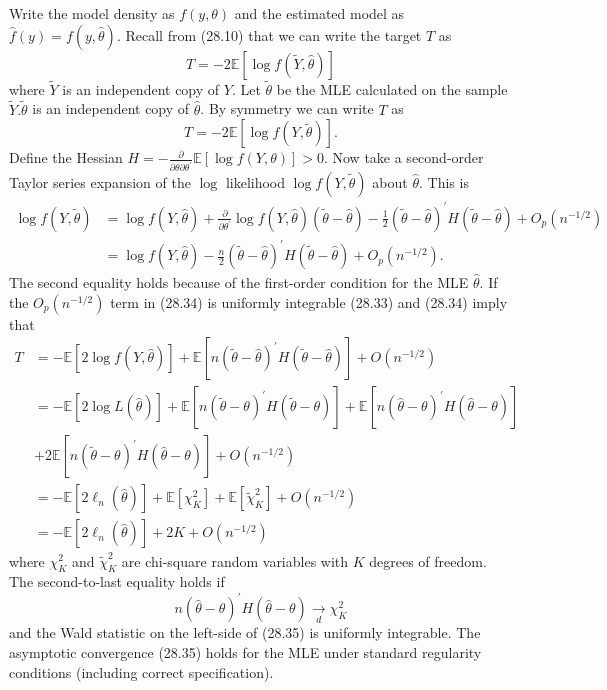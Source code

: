 \documentclass[10pt]{article}
\begin{document}
Write the model density as $f(y, \theta)$ and the estimated model as $\widehat{f}(y)=f(y, \widehat{\theta})$. Recall from (28.10) that we can write the target $T$ as
$$
T=-2 \mathbb{E}[\log f(\widetilde{Y}, \widehat{\theta})]
$$
where $\widetilde{Y}$ is an independent copy of $Y$. Let $\widetilde{\theta}$ be the MLE calculated on the sample $\widetilde{Y} . \widetilde{\theta}$ is an independent copy of $\widehat{\theta}$. By symmetry we can write $T$ as
$$
T=-2 \mathbb{E}[\log f(Y, \widetilde{\theta})] .
$$
Define the Hessian $H=-\frac{\partial}{\partial \theta \partial \theta^{\prime}} \mathbb{E}[\log f(Y, \theta)]>0$. Now take a second-order Taylor series expansion of the $\log$ likelihood $\log f(Y, \widetilde{\theta})$ about $\widehat{\theta}$. This is
$$
\begin{aligned}
\log f(Y, \widetilde{\theta}) &=\log f(Y, \widehat{\theta})+\frac{\partial}{\partial \theta^{\prime}} \log f(Y, \widehat{\theta})(\widetilde{\theta}-\widehat{\theta})-\frac{1}{2}(\widetilde{\theta}-\widehat{\theta})^{\prime} H(\widetilde{\theta}-\widehat{\theta})+O_{p}\left(n^{-1 / 2}\right) \\
&=\log f(Y, \widehat{\theta})-\frac{n}{2}(\widetilde{\theta}-\widehat{\theta})^{\prime} H(\widetilde{\theta}-\widehat{\theta})+O_{p}\left(n^{-1 / 2}\right) .
\end{aligned}
$$
The second equality holds because of the first-order condition for the MLE $\widehat{\theta}$. If the $O_{p}\left(n^{-1 / 2}\right)$ term in (28.34) is uniformly integrable (28.33) and (28.34) imply that
$$
\begin{aligned}
T &=-\mathbb{E}[2 \log f(Y, \widehat{\theta})]+\mathbb{E}\left[n(\widetilde{\theta}-\widehat{\theta})^{\prime} H(\widetilde{\theta}-\widehat{\theta})\right]+O\left(n^{-1 / 2}\right) \\
&=-\mathbb{E}[2 \log L(\widehat{\theta})]+\mathbb{E}\left[n(\widetilde{\theta}-\theta)^{\prime} H(\widetilde{\theta}-\theta)\right]+\mathbb{E}\left[n(\widehat{\theta}-\theta)^{\prime} H(\widehat{\theta}-\theta)\right] \\
&+2 \mathbb{E}\left[n(\widetilde{\theta}-\theta)^{\prime} H(\widehat{\theta}-\theta)\right]+O\left(n^{-1 / 2}\right) \\
&=-\mathbb{E}\left[2 \ell_{n}(\widehat{\theta})\right]+\mathbb{E}\left[\chi_{K}^{2}\right]+\mathbb{E}\left[\widetilde{\chi}_{K}^{2}\right]+O\left(n^{-1 / 2}\right) \\
&=-\mathbb{E}\left[2 \ell_{n}(\widehat{\theta})\right]+2 K+O\left(n^{-1 / 2}\right)
\end{aligned}
$$
where $\chi_{K}^{2}$ and $\widetilde{\chi}_{K}^{2}$ are chi-square random variables with $K$ degrees of freedom. The second-to-last equality holds if
$$
n(\widehat{\theta}-\theta)^{\prime} H(\widehat{\theta}-\theta) \underset{d}{\longrightarrow} \chi_{K}^{2}
$$
and the Wald statistic on the left-side of (28.35) is uniformly integrable. The asymptotic convergence (28.35) holds for the MLE under standard regularity conditions (including correct specification).
\end{document}
